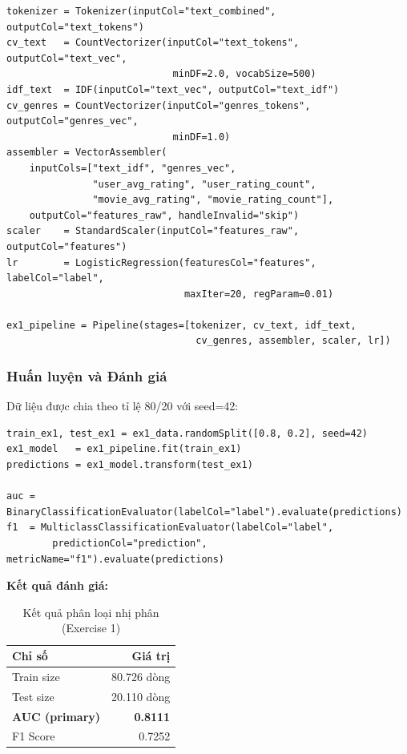 \begin{lstlisting}[style=PythonStyle, caption={Khai báo và xây dựng pipeline phân loại}]
tokenizer = Tokenizer(inputCol="text_combined", outputCol="text_tokens")
cv_text   = CountVectorizer(inputCol="text_tokens", outputCol="text_vec",
                             minDF=2.0, vocabSize=500)
idf_text  = IDF(inputCol="text_vec", outputCol="text_idf")
cv_genres = CountVectorizer(inputCol="genres_tokens", outputCol="genres_vec",
                             minDF=1.0)
assembler = VectorAssembler(
    inputCols=["text_idf", "genres_vec",
               "user_avg_rating", "user_rating_count",
               "movie_avg_rating", "movie_rating_count"],
    outputCol="features_raw", handleInvalid="skip")
scaler    = StandardScaler(inputCol="features_raw", outputCol="features")
lr        = LogisticRegression(featuresCol="features", labelCol="label",
                               maxIter=20, regParam=0.01)

ex1_pipeline = Pipeline(stages=[tokenizer, cv_text, idf_text,
                                 cv_genres, assembler, scaler, lr])
\end{lstlisting}

\subsubsection{Huấn luyện và Đánh giá}

Dữ liệu được chia theo tỉ lệ 80/20 với seed=42:

\begin{lstlisting}[style=PythonStyle, caption={Huấn luyện và tính toán chỉ số đánh giá}]
train_ex1, test_ex1 = ex1_data.randomSplit([0.8, 0.2], seed=42)
ex1_model   = ex1_pipeline.fit(train_ex1)
predictions = ex1_model.transform(test_ex1)

auc = BinaryClassificationEvaluator(labelCol="label").evaluate(predictions)
f1  = MulticlassClassificationEvaluator(labelCol="label",
        predictionCol="prediction", metricName="f1").evaluate(predictions)
\end{lstlisting}

\textbf{Kết quả đánh giá:}

\begin{table}[h]
\centering
\begin{tabular}{|l|r|}
\hline
\textbf{Chỉ số} & \textbf{Giá trị} \\
\hline
Train size & 80.726 dòng \\
\hline
Test size  & 20.110 dòng \\
\hline
\textbf{AUC (primary)} & \textbf{0.8111} \\
\hline
F1 Score   & 0.7252 \\
\hline
\end{tabular}
\caption{Kết quả phân loại nhị phân (Exercise 1)}
\end{table}

